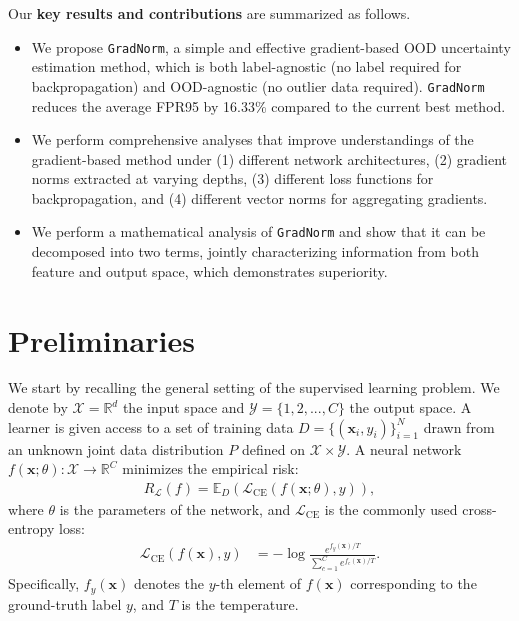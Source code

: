 \documentclass{article}
\def\*#1{\mathbf{#1}}
\begin{document}
Our \textbf{key results and contributions} are summarized as follows. 
\begin{itemize}
\item We propose \texttt{GradNorm}, a simple and effective gradient-based OOD uncertainty estimation method, which is both label-agnostic (no label required for backpropagation) and OOD-agnostic (no outlier data required). \texttt{GradNorm} reduces the average FPR95 by {16.33\%} compared to the current best method.
\item We perform comprehensive analyses that improve understandings of the gradient-based method under (1) different network architectures, (2) gradient norms extracted at varying depths, (3) different loss functions for backpropagation, and (4) different vector norms for aggregating gradients. 
\item We perform a mathematical analysis of \texttt{GradNorm} and show that it can be decomposed into two terms, jointly characterizing information from both feature and output space, which demonstrates superiority. 
\end{itemize}




















\vspace{-0.2cm}
\section{Preliminaries}
\label{sec:background}
\vspace{-0.2cm}
We start by recalling the general setting of the supervised learning problem. We denote by $\mathcal{X}=\mathbb{R}^d$ the input space and $\mathcal{Y}=\{1,2,..., C\}$ the output space. A learner is given access to a set of training data $D=\{(\*x_i,y_i)\}_{i=1}^N$ drawn from an unknown joint data distribution $P$ defined on $\mathcal{X}\times \mathcal{Y}$. A neural network $f(\*x;\theta): \mathcal{X} \to \mathbb{R}^C$ minimizes the empirical risk: \begin{align*}
R_\mathcal{L}(f)=\mathbb{E}_{D}(\mathcal{L}_\text{CE}(f(\*x;\theta),y)),
\end{align*}
where $\theta$ is the parameters of the network, and $\mathcal{L}_\text{CE}$ is the commonly used cross-entropy loss:
\begin{align}
    \mathcal{L}_\text{CE} (f(\*x),y) &= - \log{ \frac{e^{{f_{y}(\*x)} / T}}{\sum_{c=1}^C e^{{f_{c}(\*x)} / T}}}.
\end{align}
Specifically, $f_y(\*x)$ denotes the $y$-th element of $f(\*x)$ corresponding to the ground-truth label $y$, and $T$ is the temperature.
\end{document}
